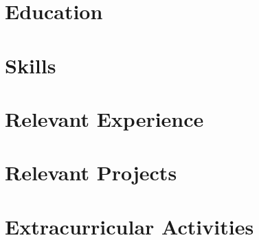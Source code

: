 \documentclass[letterpaper,8pt]{article}
\begin{document}


\vspace{-4mm} %
% 

\vspace{-3mm} %
\section{Education}


\vspace{-4mm} %

\section{Skills}
\vspace{-0.5mm} %


\vspace{-6mm} %
\section{Relevant Experience}
\resumeSubHeadingListStart
      
      
      

  \resumeSubHeadingListEnd

  \vspace{-4.1mm} %

\section{Relevant Projects}
    \resumeSubHeadingListStart

    
    
    

    \resumeSubHeadingListEnd
  \vspace{-5mm} %

\section{Extracurricular Activities }

    
\end{document}
